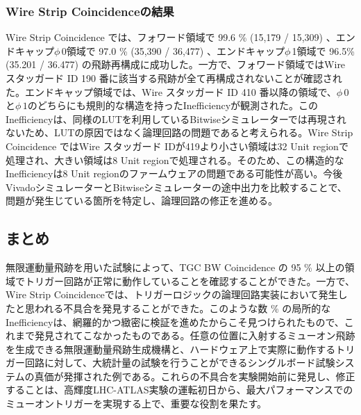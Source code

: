 \subsubsection*{Wire Strip Coincidenceの結果}
Wire Strip Coincidence では、フォワード領域で 99.6 \% (15,179 / 15,309) 、エンドキャップ$\phi\,$0領域で 97.0 \% (35,390 / 36,477) 、エンドキャップ$\phi\,$1領域で 96.5\% (35.201 / 36.477) の飛跡再構成に成功した。一方で、フォワード領域ではWire スタッガード ID 190 番に該当する飛跡が全て再構成されないことが確認された。エンドキャップ領域では、Wire スタッガード ID 410 番以降の領域で、$\phi\,0$と$\phi\,1$のどちらにも規則的な構造を持ったInefficiencyが観測された。このInefficiencyは、同様のLUTを利用しているBitwiseシミュレーターでは再現されないため、LUTの原因ではなく論理回路の問題であると考えられる。Wire Strip Coincidence ではWire スタッガード IDが419より小さい領域は32 Unit regionで処理され、大きい領域は8 Unit regionで処理される。そのため、この構造的なInefficiencyは8 Unit regionのファームウェアの問題である可能性が高い。今後VivadoシミュレーターとBitwiseシミュレーターの途中出力を比較することで、問題が発生じている箇所を特定し、論理回路の修正を進める。

\subsection{まとめ}
無限運動量飛跡を用いた試験によって、TGC BW Coincidence の 95 \% 以上の領域でトリガー回路が正常に動作していることを確認することができた。一方で、Wire Strip Coincidenceでは、トリガーロジックの論理回路実装において発生したと思われる不具合を発見することができた。このような数 \% の局所的なInefficiencyは、網羅的かつ緻密に検証を進めたからこそ見つけられたもので、これまで発見されてこなかったものである。任意の位置に入射するミューオン飛跡を生成できる無限運動量飛跡生成機構と、ハードウェア上で実際に動作するトリガー回路に対して、大統計量の試験を行うことができるシングルボード試験システムの真価が発揮された例である。これらの不具合を実験開始前に発見し、修正することは、高輝度LHC-ATLAS実験の運転初日から、最大パフォーマンスでのミューオントリガーを実現する上で、重要な役割を果たす。

